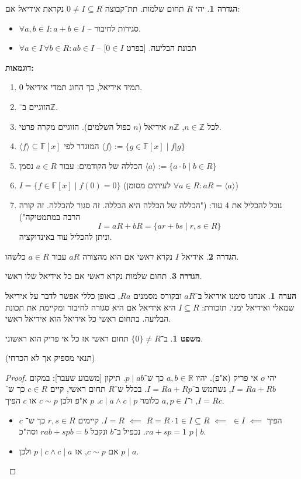 \documentclass[a4paper]{article}
\newcommand\Z     {\mathbb{Z}}
\newcommand\R     {\mathbb{R}}
\newcommand\ra    {\rangle}
\newcommand\la    {\langle}
\newcommand\F         {\mathbb{F}}
\newcommand\co        {\colon}
\theoremstyle{definition}
\newtheorem{Theorem}{משפט}
\newtheorem{definition}{הגדרה}
\newtheorem{Remark}{הערה}
\newcommand\theo  [1] {\begin{Theorem}#1\end{Theorem}}
\newcommand\defi  [1] {\begin{definition}#1\end{definition}}
\newcommand\rmark [1] {\begin{Remark}#1\end{Remark}}
\begin{document}
	\defi{יהי $R$ תחום שלמות. תת־קבוצה $0 \neq I \subseteq R$ נקראת \textit{אידיאל} אם: 
		\begin{itemize}[A.]
			\item $\forall a, b \in I \co a + b \in I$ – סגירות לחיבור. 
			\item $\forall a \in I \, \forall b \in R \co ab \in I$ – תכונת הבליעה. [בפרט $0 \in I$]
	\end{itemize}}
	\textbf{דוגמאות: }\begin{enumerate}
		\item $0$ תמיד אידיאל, כך החוג תמדי אידיאל. 
		\item הזוגיים ב־$\Z$. 
		\item לכל $n \in \Z$, $n\Z$ אידיאל ($n$ כפול השלמים). הזוגיים מקרה פרטי. 
		\item $\la f \ra \subseteq \F[x]$ המוגדר לפי $\la f \ra := \{g \in \F[x] \mid f|g\}$
		\item הכללה של הקודמים: עבור $a \in R$ נסמן $\la a \ra := \{a \cdot b \mid b \in R\}$
		\item $I = \{f \in \F[x] \mid f(0) = 0\}$ (לעיתים מסומן $\forall a \in R \co aR = \la a \ra$)
		\item נוכל להכליל את 4 עוד: ("הכללה של הכללה היא הכללה. זה סגור להכללה. זה קורה הרבה במתמטיקה")
		\[ I = aR + bR = \{ar + bs \mid r, s \in R\} \]
		וניתן להכליל עוד באינדוקציה. 
	\end{enumerate}
	\defi{אידיאל $I$ נקרא \textit{ראשי} אם הוא מהצורה $aR$ עבור $a \in R$ כלשהו. }
	\defi{תחום שלמות נקרא \textit{ראשי} אם כל אידיאל שלו ראשי. }
	
	\rmark{אנחנו סימנו אידיאל ב־$aR$ ובקורס מסמנים $Ra$, באופן כללי אפשר לדבר על אידיאל שמאלי ואידיאל ימני. תזכורת: $I \subseteq R$ היא אידיאל אם היא סגורה לחיבור ומקיימת את תכונת הבליעה. בתחום ראשי כל אידיאל הוא אידיאל ראשי. }
	
	\theo{ב־$\{0\} \neq R$ תחום ראשי אז כל אי פריק הוא ראשוני. }
	(תנאי מספיק אך לא הכרחי)
	\begin{proof}
		יהי $o$ אי פריק (א"פ). יהיו $a, b \in \R$ כך ש־$p \mid ab$. תיקון [משבוע שעבר]: במקום $I = Ra + Rb$, נשתמש ב־$I = Ra + Rp$. 
		בכלל ש־$R$ תחום ראשי, קיים $c \in R$ כך ש־$I = Rc$, ו־$a, p \in I$ כלומר $c \mid a \land c \mid p$. $p$ א"פ ולכן $c \sim p$ או $c$ הפיך. 
		\begin{itemize}
			\item $c$ הפיך $\impliedby$ $ \in I$ $\impliedby$ $R = R \cdot 1 \in I \subseteq R$ $\impliedby$ $I = R$. קיימים $r, s \in R$ כך ש־$ra + sp = 1$. נכפיל ב־$b$ ונקבל $rab + spb = b$ וסה"כ $p \mid b$. 
			\item אם $c \sim p$, אז $p \mid c \land c \mid a$ ולכן $p \mid a$. 
		\end{itemize}
	\end{proof}
	
\end{document}
